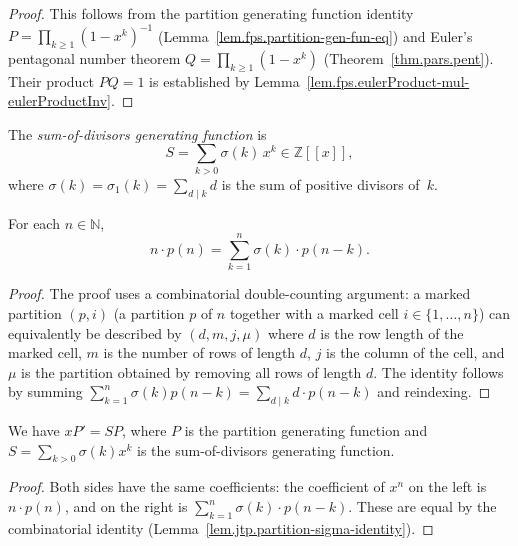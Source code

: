 \begin{proof}
\leanok
This follows from the partition generating function identity
$P=\prod_{k\geq 1}(1-x^{k})^{-1}$ (Lemma~\ref{lem.fps.partition-gen-fun-eq})
and Euler's pentagonal number theorem $Q=\prod_{k\geq 1}(1-x^{k})$
(Theorem~\ref{thm.pars.pent}). Their product $PQ = 1$ is established
by Lemma~\ref{lem.fps.eulerProduct-mul-eulerProductInv}.
\end{proof}

\begin{definition}
\label{def.jtp.sigmaSeries}
\leanhelper
\leanok
The \emph{sum-of-divisors generating function} is
\[
S = \sum_{k>0} \sigma(k)\, x^k \in \mathbb{Z}[[x]],
\]
where $\sigma(k) = \sigma_1(k) = \sum_{d\mid k} d$ is the sum of
positive divisors of~$k$.
\end{definition}

\begin{lemma}
\label{lem.jtp.partition-sigma-identity}
\leanhelper
\leanok
For each $n\in\mathbb{N}$,
\[
n\cdot p(n) = \sum_{k=1}^{n} \sigma(k)\cdot p(n-k).
\]
\end{lemma}

\begin{proof}
\leanok
The proof uses a combinatorial double-counting argument: a marked partition $(p, i)$
(a partition $p$ of $n$ together with a marked cell $i\in\{1,\ldots,n\}$)
can equivalently be described by $(d, m, j, \mu)$ where $d$ is the row length of the
marked cell, $m$ is the number of rows of length $d$, $j$ is the column of the cell,
and $\mu$ is the partition obtained by removing all rows of length $d$.
The identity follows by summing $\sum_{k=1}^n \sigma(k) p(n-k) = \sum_{d\mid k} d \cdot p(n-k)$
and reindexing.
\end{proof}

\begin{lemma}
\label{lem.jtp.X-mul-deriv-partitionGenFun}
\leanhelper
\leanok
We have $xP'=SP$, where $P$ is the partition generating function and
$S=\sum_{k>0}\sigma(k)x^{k}$ is the sum-of-divisors generating function.
\end{lemma}

\begin{proof}
\leanok
Both sides have the same coefficients: the coefficient of $x^{n}$ on
the left is $n\cdot p(n)$, and on the right is
$\sum_{k=1}^{n}\sigma(k)\cdot p(n-k)$. These are equal by the
combinatorial identity (Lemma~\ref{lem.jtp.partition-sigma-identity}).
\end{proof}

